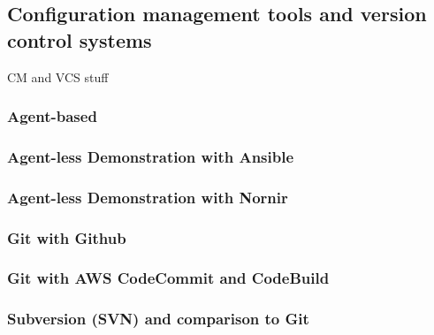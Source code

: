 \subsection{Configuration management tools and version control systems}
CM and VCS stuff

\subsubsection{Agent-based}
\subsubsection{Agent-less Demonstration with Ansible}
\subsubsection{Agent-less Demonstration with Nornir}

\subsubsection{Git with Github}
\subsubsection{Git with AWS CodeCommit and CodeBuild}
\subsubsection{Subversion (SVN) and comparison to Git}
